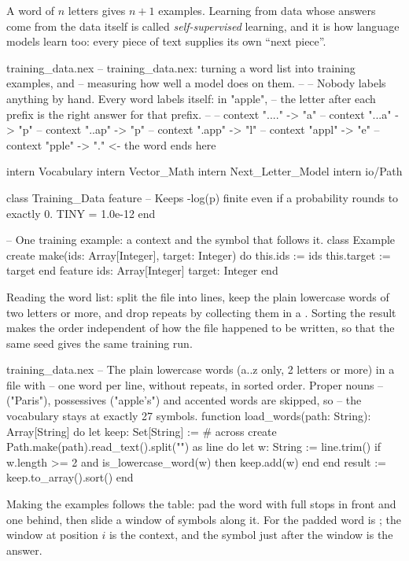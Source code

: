 \documentclass[11pt,a4paper,oneside,openany]{book}
\newcommand{\code}[1]{\texttt{\detokenize{#1}}}
\begin{document}
A word of $n$ letters gives $n+1$ examples. Learning from data whose
answers come from the data itself is called \emph{self-supervised}
learning, and it is how language models learn too: every piece of text
supplies its own ``next piece''.

\begin{newfile}{training_data.nex}
-- training_data.nex: turning a word list into training examples, and
-- measuring how well a model does on them.
--
-- Nobody labels anything by hand. Every word labels itself: in "apple",
-- the letter after each prefix is the right answer for that prefix.
--
--   context "...." -> "a"
--   context "...a" -> "p"
--   context "..ap" -> "p"
--   context ".app" -> "l"
--   context "appl" -> "e"
--   context "pple" -> "."   <- the word ends here

intern Vocabulary
intern Vector_Math
intern Next_Letter_Model
intern io/Path

class Training_Data
feature
  -- Keeps -log(p) finite even if a probability rounds to exactly 0.
  TINY = 1.0e-12
end

-- One training example: a context and the symbol that follows it.
class Example
create
  make(ids: Array[Integer], target: Integer) do
    this.ids := ids
    this.target := target
  end
feature
  ids: Array[Integer]
  target: Integer
end
\end{newfile}

Reading the word list: split the file into lines, keep the plain
lowercase words of two letters or more, and drop repeats by collecting
them in a \code{Set}. Sorting the result makes the order independent of
how the file happened to be written, so that the same seed gives the same
training run.

\begin{append}{training_data.nex}
-- The plain lowercase words (a..z only, 2 letters or more) in a file with
-- one word per line, without repeats, in sorted order. Proper nouns
-- ("Paris"), possessives ("apple's") and accented words are skipped, so
-- the vocabulary stays at exactly 27 symbols.
function load_words(path: String): Array[String] do
  let keep: Set[String] := #{}
  across create Path.make(path).read_text().split("\n") as line do
    let w: String := line.trim()
    if w.length >= 2 and is_lowercase_word(w) then
      keep.add(w)
    end
  end
  result := keep.to_array().sort()
end
\end{append}

Making the examples follows the table: pad the word with \code{context}
full stops in front and one behind, then slide a window of \code{context}
symbols along it. For \code{apple} the padded word is \code{....apple.};
the window at position $i$ is the context, and the symbol just after the
window is the answer.
\end{document}
